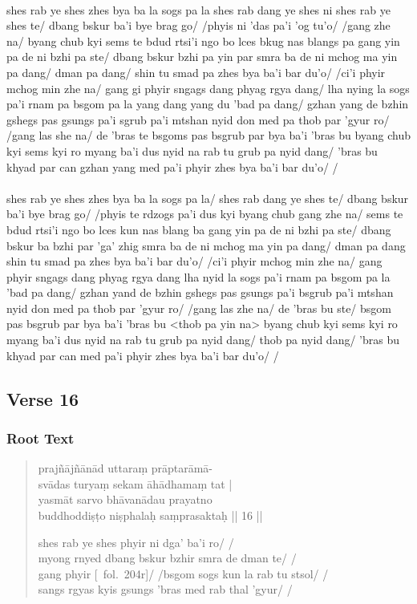 \documentclass[12pt]{article}
\begin{document}
\textbf{\TVA}\\
shes rab ye shes zhes bya ba la sogs pa la shes rab dang ye shes ni shes rab ye shes te/ dbang bskur ba'i bye brag go/ /phyis ni 'das pa'i 'og tu'o/ /gang zhe na/ byang chub kyi sems te bdud rtsi'i ngo bo lces bkug nas blangs pa gang yin pa de ni bzhi pa ste/ dbang bskur bzhi pa yin par smra ba de ni mchog ma yin pa dang/ dman pa dang/ shin tu smad pa zhes bya ba'i bar du'o/ /ci'i phyir mchog min zhe na/ gang gi phyir sngags dang phyag rgya dang/ lha nying la sogs pa'i rnam pa bsgom pa la yang dang yang du 'bad pa dang/ gzhan yang de bzhin gshegs pas gsungs pa'i sgrub pa'i mtshan nyid don med pa thob par 'gyur ro/ /gang las she na/ de 'bras te bsgoms pas bsgrub par bya ba'i 'bras bu byang chub kyi sems kyi ro myang ba'i dus nyid na rab tu grub pa nyid dang/ 'bras bu khyad par can gzhan yang med pa'i phyir zhes bya ba'i bar du'o/ /\\

\textbf{\TVB}\\
shes rab ye shes zhes bya ba la sogs pa la/ shes rab dang ye shes te/ dbang bskur ba'i bye brag go/ /phyis te rdzogs pa'i dus kyi byang chub gang zhe na/ sems te bdud rtsi'i ngo bo lces kun nas blang ba gang yin pa de ni bzhi pa ste/ dbang bskur ba bzhi par 'ga' zhig smra ba de ni mchog ma yin pa dang/ dman pa dang shin tu smad pa zhes bya ba'i bar du'o/ /ci'i phyir mchog min zhe na/ gang phyir sngags dang phyag rgya dang lha nyid la sogs pa'i rnam pa bsgom pa la 'bad pa dang/ gzhan yand de bzhin gshegs pas gsungs pa'i bsgrub pa'i mtshan nyid don med pa thob par 'gyur ro/ /gang las zhe na/ de 'bras bu ste/ bsgom pas bsgrub par bya ba'i 'bras bu <thob pa yin na> byang chub kyi sems kyi ro myang ba'i dus nyid na rab tu grub pa nyid dang/ thob pa nyid dang/ 'bras bu khyad par can med pa'i phyir zhes bya ba'i bar du'o/ /

\subsection{Verse 16}
\subsubsection{Root Text}
\begin{quote}
	prajñājñānād uttaraṃ prāptarāmā-\\
	svādas turyaṃ sekam āhādhamaṃ tat |\\
	yasmāt sarvo bhāvanādau prayatno \\
	buddhoddiṣṭo niṣphalaḥ saṃprasaktaḥ || 16 ||

	shes rab ye shes phyir ni dga' ba'i ro/ /\\
	myong rnyed dbang bskur bzhir smra de dman te/ /\\
	gang phyir [\TM\ fol.\ 204r]/ /bsgom sogs kun la rab tu stsol/ /\\
	sangs rgyas kyis gsungs 'bras med rab thal 'gyur/ /
\end{quote}
\end{document}
